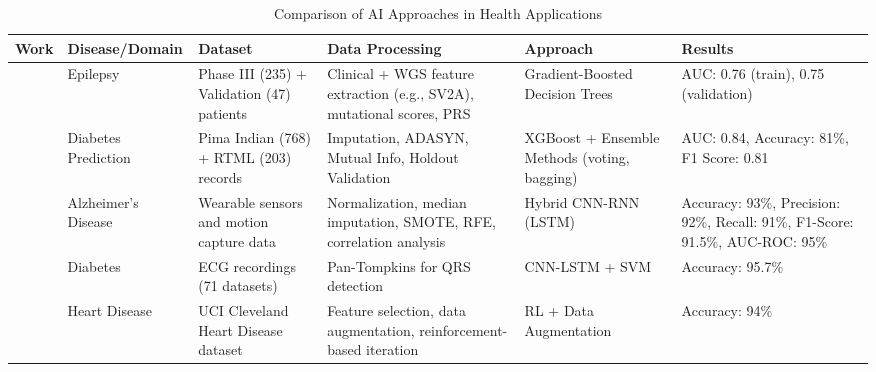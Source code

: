 \begin{table}[htbp]
    \begin{adjustwidth}{-2cm}{-2cm}
    \centering
    \begin{tabular}{|p{1.5cm}|p{2.5cm}|p{3cm}|p{3.5cm}|p{2.5cm}|p{2.5cm}|}
    \hline
    \textbf{Work} & \textbf{Disease/Domain} & \textbf{Dataset} & \textbf{Data Processing} & \textbf{Approach} & \textbf{Results} \\
    \hline
    \cite{article_1} & Epilepsy & Phase III (235) + Validation (47) patients & Clinical + WGS feature extraction (e.g., SV2A), mutational scores, PRS & Gradient-Boosted Decision Trees & AUC: 0.76 (train), 0.75 (validation) \\
    \hline
    \cite{article_2} & Diabetes Prediction & Pima Indian (768) + RTML (203) records & Imputation, ADASYN, Mutual Info, Holdout Validation & XGBoost + Ensemble Methods (voting, bagging) & AUC: 0.84, Accuracy: 81\%, F1 Score: 0.81 \\
    \hline
    \cite{article_3} & Alzheimer’s Disease & Wearable sensors and motion capture data & Normalization, median imputation, SMOTE, RFE, correlation analysis & Hybrid CNN-RNN (LSTM) & Accuracy: 93\%, Precision: 92\%, Recall: 91\%, F1-Score: 91.5\%, AUC-ROC: 95\% \\
    \hline
    \cite{article_4} & Diabetes & ECG recordings (71 datasets) & Pan-Tompkins for QRS detection & CNN-LSTM + SVM & Accuracy: 95.7\% \\
    \hline
    \cite{article_5} & Heart Disease & UCI Cleveland Heart Disease dataset & Feature selection, data augmentation, reinforcement-based iteration & RL + Data Augmentation & Accuracy: 94\% \\
    \hline
    \end{tabular}
    \caption{Comparison of AI Approaches in Health Applications}
    \label{tab:ai_health_comparison}
    \end{adjustwidth}
\end{table}


